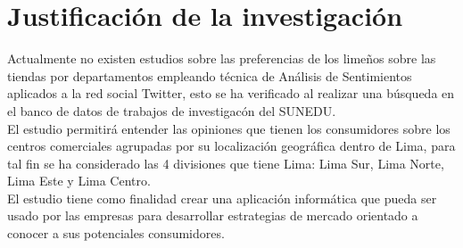 
\chapter{Justificación de la investigaci\'on}
\label{intro}

Actualmente no existen estudios sobre las preferencias  de los lime\~nos sobre las tiendas por departamentos empleando técnica de Análisis de Sentimientos aplicados a la red social Twitter, esto se ha verificado al realizar una b\'usqueda en el banco de datos de trabajos de investigac\'on del SUNEDU. \\

El estudio permitirá entender las opiniones que tienen los consumidores sobre los centros 
comerciales agrupadas por su 
localización geográfica dentro de Lima, para tal fin se ha considerado las 4 divisiones 
que tiene Lima:  Lima Sur, Lima Norte, Lima Este y Lima Centro. \\

El estudio tiene como finalidad crear una aplicación informática que pueda ser usado 
por las empresas para desarrollar estrategias de mercado orientado a conocer a sus 
potenciales consumidores.

\cleardoublepage
